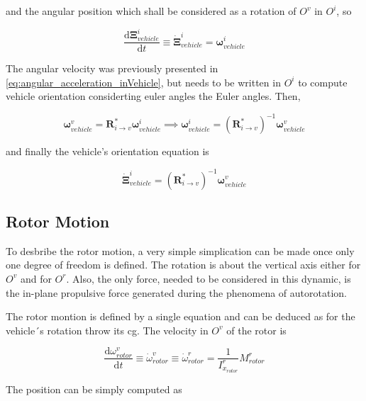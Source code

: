 and the angular position which shall be considered as a rotation of $O^v$ in $O^i$, so


\begin{equation}
    \frac{\mathrm{d}\boldsymbol{\Xi}^i_{vehicle}}{\mathrm{d}t} \equiv \dot{\boldsymbol{\Xi}}^i_{vehicle} = \boldsymbol{\omega}^i_{vehicle}
\end{equation}

The angular velocity was previously presented in \ref{eq:angular_acceleration_inVehicle}, but needs to be written in $O^i$ to compute vehicle orientation considerting euler angles the Euler angles. Then,

\begin{equation}
    \boldsymbol{\omega}^v_{vehicle} = \boldsymbol{R}^*_{i \rightarrow v} \boldsymbol{\omega}^i_{vehicle} \implies \boldsymbol{\omega}^i_{vehicle} = \left(\boldsymbol{R}^*_{i \rightarrow v}\right)^{-1} \boldsymbol{\omega}^v_{vehicle} 
\end{equation}

and finally the vehicle's orientation equation is

\begin{equation}
    \dot{\boldsymbol{\Xi}}^i_{vehicle} = \left(\boldsymbol{R}^*_{i \rightarrow v}\right)^{-1} \boldsymbol{\omega}^v_{vehicle} 
\end{equation}

\subsection{Rotor Motion}
\label{section:rotor_Motion}

To desbribe the rotor motion, a very simple simplication can be made once only one degree of freedom is defined. The rotation is about the vertical axis either for $O^v$ and for $O^r$. Also, the only force, needed to be considered in this dynamic, is the in-plane propulsive force generated during the phenomena of autorotation.

The rotor montion is defined by a single equation and can be deduced as for the vehicle´s rotation throw its \gls{cg}. The velocity in $O^v$ of the rotor is 


\begin{equation}
    \frac{\mathrm{d}\omega^v_{rotor}}{\mathrm{d}t} \equiv \dot{\omega}^v_{rotor} \equiv \dot{\omega}^r_{rotor} = \frac{1}{I^r_{x_{rotor}}} M^r_{rotor}
\end{equation}

The position can be simply computed as

